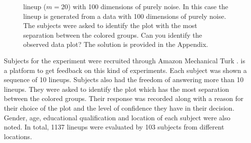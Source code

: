 \documentclass[12]{article}
\begin{document}
\begin{figure}[hbtp]
   \centering
       \caption{lineup  ($m=20$) with 100 dimensions of purely noise. In this case the lineup is generated from a data with 100 dimensions of purely noise. The subjects were asked to identify the plot with the most separation between the colored groups. Can you identify the observed data plot? The solution is provided in the Appendix. }
       \label{fig:test_category}
\end{figure}

Subjects  for the experiment were recruited through Amazon Mechanical Turk  \citep{turk}.  \cite{turk} is a platform to get feedback on this kind of experiments. Each subject was shown a sequence of 10 lineups. Subjects also had the freedom of answering more than 10 lineups. They were asked to identify the plot which has the most separation between the colored groups. Their response was recorded along with a reason for their choice of the plot and the level of confidence they have in their decision.  Gender, age, educational qualification and location of each subject were also noted. In total, 1137 lineups were evaluated by 103 subjects from different locations.


\end{document}
